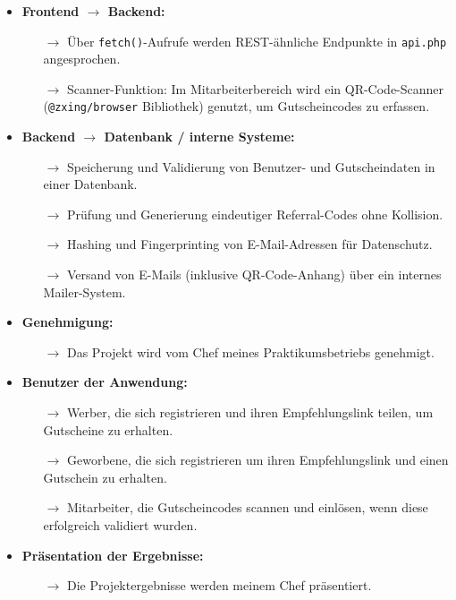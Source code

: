 \begin{itemize}
    \item \textbf{Frontend $\longrightarrow$ Backend:}
    \begin{itemize}
        \item[$\rightarrow$] Über \texttt{fetch()}-Aufrufe werden REST-ähnliche Endpunkte in \texttt{api.php} angesprochen.
        \item[$\rightarrow$] Scanner-Funktion: Im Mitarbeiterbereich wird ein QR-Code-Scanner (\texttt{@zxing/browser} Bibliothek) genutzt, um Gutscheincodes zu erfassen.
    \end{itemize}

    \item \textbf{Backend $\longrightarrow$ Datenbank / interne Systeme:}
    \begin{itemize}
        \item[$\rightarrow$] Speicherung und Validierung von Benutzer- und Gutscheindaten in einer Datenbank.
        \item[$\rightarrow$] Prüfung und Generierung eindeutiger Referral-Codes ohne Kollision.
        \item[$\rightarrow$] Hashing und Fingerprinting von E-Mail-Adressen für Datenschutz.
        \item[$\rightarrow$] Versand von E-Mails (inklusive QR-Code-Anhang) über ein internes Mailer-System.
    \end{itemize}

    \item \textbf{Genehmigung:}
    \begin{itemize}
        \item[$\rightarrow$] Das Projekt wird vom Chef meines Praktikumsbetriebs genehmigt.
    \end{itemize}

    \item \textbf{Benutzer der Anwendung:}
    \begin{itemize}
        \item[$\rightarrow$] Werber, die sich registrieren und ihren Empfehlungslink teilen, um Gutscheine zu erhalten.
        \item[$\rightarrow$] Geworbene, die sich registrieren um ihren Empfehlungslink und einen Gutschein zu erhalten.
        \item[$\rightarrow$] Mitarbeiter, die Gutscheincodes scannen und einlösen, wenn diese erfolgreich validiert wurden.
    \end{itemize}

    \item \textbf{Präsentation der Ergebnisse:}
    \begin{itemize}
        \item[$\rightarrow$] Die Projektergebnisse werden meinem Chef präsentiert.
    \end{itemize}
\end{itemize}

